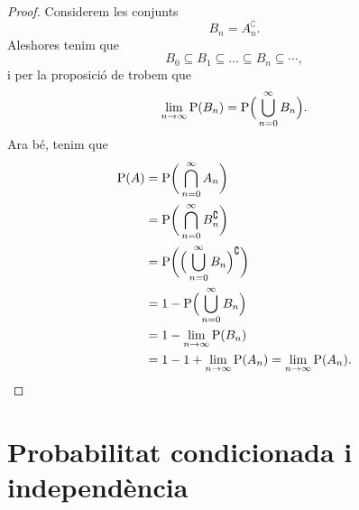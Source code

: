 \documentclass[../probabilitat.tex]{subfiles}
\begin{document}
    \begin{proof}
        Considerem les conjunts
        \[
            B_{n}=A_{n}^{\complement}.
        \]
        Aleshores tenim que
        \[
            B_{0}\subseteq B_{1}\subseteq\dots\subseteq B_{n}\subseteq\cdots,
        \]
        i per la proposició de  trobem que
        \[
            \lim_{n\to\infty}\mathrm{P}(B_{n})=\mathrm{P}\Big(\bigcup_{n=0}^{\infty}B_{n}\Big).
        \]
        Ara bé, tenim que
        \begin{align*}
            \mathrm{P}(A)&=\mathrm{P}\bigg(\bigcap_{n=0}^{\infty}A_{n}\bigg) \\
            &=\mathrm{P}\bigg(\bigcap_{n=0}^{\infty}B_{n}^{\complement}\bigg) \\
            &=\mathrm{P}\bigg(\Big(\bigcup_{n=0}^{\infty}B_{n}\Big)^{\complement}\bigg) \\
            &=1-\mathrm{P}\Big(\bigcup_{n=0}^{\infty}B_{n}\Big) \\
            &=1-\lim_{n\to\infty}\mathrm{P}(B_{n}) \\
            &=1-1+\lim_{n\to\infty}\mathrm{P}(A_{n})=\lim_{n\to\infty}\mathrm{P}(A_{n}).\qedhere
        \end{align*}
    \end{proof}
\section{Probabilitat condicionada i independència}
\end{document}
